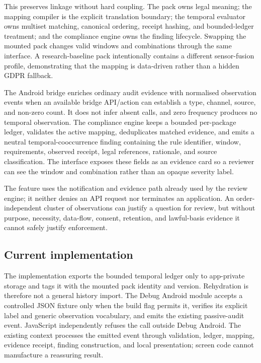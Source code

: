 This preserves linkage without hard coupling. The pack owns legal meaning; the mapping compiler is the explicit translation boundary; the temporal evaluator owns multiset matching, canonical ordering, receipt hashing, and bounded-ledger treatment; and the compliance engine owns the finding lifecycle. Swapping the mounted pack changes valid windows and combinations through the same interface. A research-baseline pack intentionally contains a different sensor-fusion profile, demonstrating that the mapping is data-driven rather than a hidden GDPR fallback.

The Android bridge enriches ordinary audit evidence with normalised observation events when an available bridge API/action can establish a type, channel, source, and non-zero count. It does not infer absent calls, and zero frequency produces no temporal observation. The compliance engine keeps a bounded per-package ledger, validates the active mapping, deduplicates matched evidence, and emits a neutral temporal-cooccurrence finding containing the rule identifier, window, requirements, observed receipt, legal references, rationale, and source classification. The interface exposes these fields as an evidence card so a reviewer can see the window and combination rather than an opaque severity label.

The feature uses the notification and evidence path already used by the review engine; it neither denies an API request nor terminates an application. An order-independent cluster of observations can justify a question for review, but without purpose, necessity, data-flow, consent, retention, and lawful-basis evidence it cannot safely justify enforcement.

\subsection{Current implementation}

The implementation exports the bounded temporal ledger only to app-private storage and tags it with the mounted pack identity and version. Rehydration is therefore not a general history import. The Debug Android module accepts a controlled JSON fixture only when the build flag permits it, verifies its explicit label and generic observation vocabulary, and emits the existing passive-audit event. JavaScript independently refuses the call outside Debug Android. The existing context processes the emitted event through validation, ledger, mapping, evidence receipt, finding construction, and local presentation; screen code cannot manufacture a reassuring result.
